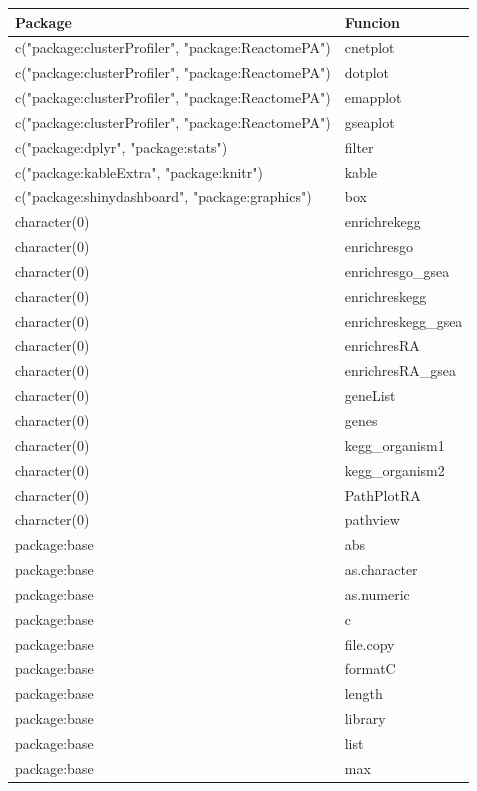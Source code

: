 \documentclass[]{article}
\begin{document}
\begin{longtable}{ll}
\toprule
Package & Funcion\\
\midrule
\rowcolor{gray!6} c("package:clusterProfiler", "package:ReactomePA") & cnetplot\\
c("package:clusterProfiler", "package:ReactomePA") & dotplot\\
\rowcolor{gray!6} c("package:clusterProfiler", "package:ReactomePA") & emapplot\\
c("package:clusterProfiler", "package:ReactomePA") & gseaplot\\
\rowcolor{gray!6} c("package:dplyr", "package:stats") & filter\\
c("package:kableExtra", "package:knitr") & kable\\
\rowcolor{gray!6} c("package:shinydashboard", "package:graphics") & box\\
character(0) & enrichrekegg\\
\rowcolor{gray!6} character(0) & enrichresgo\\
character(0) & enrichresgo\_gsea\\
\rowcolor{gray!6} character(0) & enrichreskegg\\
character(0) & enrichreskegg\_gsea\\
\rowcolor{gray!6} character(0) & enrichresRA\\
character(0) & enrichresRA\_gsea\\
\rowcolor{gray!6} character(0) & geneList\\
character(0) & genes\\
\rowcolor{gray!6} character(0) & kegg\_organism1\\
character(0) & kegg\_organism2\\
\rowcolor{gray!6} character(0) & PathPlotRA\\
character(0) & pathview\\
\rowcolor{gray!6} package:base & abs\\
package:base & as.character\\
\rowcolor{gray!6} package:base & as.numeric\\
package:base & c\\
\rowcolor{gray!6} package:base & file.copy\\
package:base & formatC\\
\rowcolor{gray!6} package:base & length\\
package:base & library\\
\rowcolor{gray!6} package:base & list\\
package:base & max\\

\end{longtable}
\end{document}
